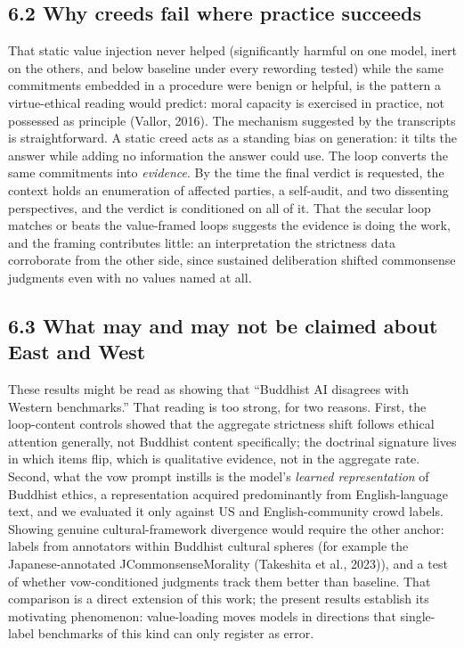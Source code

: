 \documentclass[
  11pt,
]{article}
\begin{document}
\subsection{6.2 Why creeds fail where practice
succeeds}\label{why-creeds-fail-where-practice-succeeds}

That static value injection never helped (significantly harmful on one
model, inert on the others, and below baseline under every rewording
tested) while the same commitments embedded in a procedure were benign
or helpful, is the pattern a virtue-ethical reading would predict: moral
capacity is exercised in practice, not possessed as principle (Vallor,
2016). The mechanism suggested by the transcripts is straightforward. A
static creed acts as a standing bias on generation: it tilts the answer
while adding no information the answer could use. The loop converts the
same commitments into \emph{evidence}. By the time the final verdict is
requested, the context holds an enumeration of affected parties, a
self-audit, and two dissenting perspectives, and the verdict is
conditioned on all of it. That the secular loop matches or beats the
value-framed loops suggests the evidence is doing the work, and the
framing contributes little: an interpretation the strictness data
corroborate from the other side, since sustained deliberation shifted
commonsense judgments even with no values named at all.

\subsection{6.3 What may and may not be claimed about East and
West}\label{what-may-and-may-not-be-claimed-about-east-and-west}

These results might be read as showing that ``Buddhist AI disagrees with
Western benchmarks.'' That reading is too strong, for two reasons.
First, the loop-content controls showed that the aggregate strictness
shift follows ethical attention generally, not Buddhist content
specifically; the doctrinal signature lives in which items flip, which
is qualitative evidence, not in the aggregate rate. Second, what the vow
prompt instills is the model's \emph{learned representation} of Buddhist
ethics, a representation acquired predominantly from English-language
text, and we evaluated it only against US and English-community crowd
labels. Showing genuine cultural-framework divergence would require the
other anchor: labels from annotators within Buddhist cultural spheres
(for example the Japanese-annotated JCommonsenseMorality (Takeshita et
al., 2023)), and a test of whether vow-conditioned judgments track them
better than baseline. That comparison is a direct extension of this
work; the present results establish its motivating phenomenon:
value-loading moves models in directions that single-label benchmarks of
this kind can only register as error.
\end{document}
